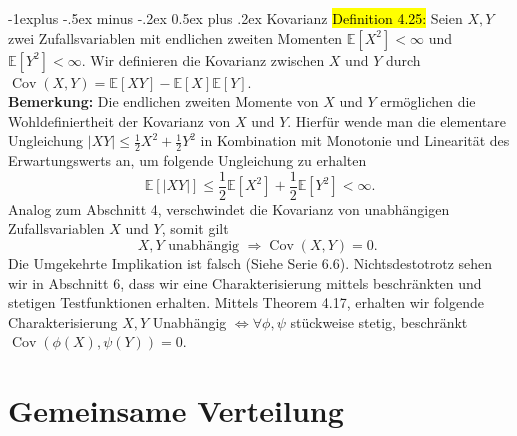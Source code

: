 \documentclass[10pt,landscape]{article}
\makeatletter
\newcommand{\blue}[1]{\sethlcolor{cyan} \hl{#1}}
\renewcommand{\subsection}{\@startsection{subsection}{1}{0mm}%
                                {-1ex plus -.5ex minus -.2ex}%
                                {0.5ex plus .2ex}%
                                {\normalfont\large\bfseries}}
\renewcommand{\subsection}{\@startsection{subsection}{2}{0mm}%
                                {-1explus -.5ex minus -.2ex}%
                                {0.5ex plus .2ex}%
                                {\normalfont\normalsize\bfseries}}
\makeatother
\begin{document}
\begin{multicols}{3}
\subsection{Kovarianz}
\blue{Definition 4.25:} Seien $X, Y$ zwei Zufallsvariablen mit endlichen zweiten Momenten $\mathbb{E}\left[X^{2}\right]<\infty$ und $\mathbb{E}\left[Y^{2}\right]<\infty$. Wir definieren die Kovarianz zwischen $X$ und $Y$ durch
$\operatorname{Cov}(X, Y)=\mathbb{E}[X Y]-\mathbb{E}[X] \mathbb{E}[Y]$. \\
\textbf{Bemerkung:} Die endlichen zweiten Momente von $X$ und $Y$ ermöglichen die Wohldefiniertheit der Kovarianz von $X$ und $Y$. Hierfür wende man die elementare Ungleichung $|X Y| \leq \frac{1}{2} X^{2}+\frac{1}{2} Y^{2}$ in Kombination mit Monotonie und Linearität des Erwartungswerts an, um folgende Ungleichung zu erhalten
$$
\mathbb{E}[|X Y|] \leq \frac{1}{2} \mathbb{E}\left[X^{2}\right]+\frac{1}{2} \mathbb{E}\left[Y^{2}\right]<\infty .
$$
Analog zum Abschnitt 4, verschwindet die Kovarianz von unabhängigen Zufallsvariablen $X$ und $Y$, somit gilt
$$
X, Y \text { unabhängig } \Longrightarrow \operatorname{Cov}(X, Y)=0 \text {. }
$$
Die Umgekehrte Implikation ist falsch (Siehe Serie 6.6). Nichtsdestotrotz sehen wir in Abschnitt 6, dass wir eine Charakterisierung mittels beschränkten und stetigen Testfunktionen erhalten. Mittels Theorem 4.17, erhalten wir folgende Charakterisierung
$X, Y$ Unabhängig $\Longleftrightarrow \forall \phi, \psi$ stückweise stetig, beschränkt $\operatorname{Cov}(\phi(X), \psi(Y))=0$.
\section{Gemeinsame Verteilung}

\end{multicols}
\end{document}
